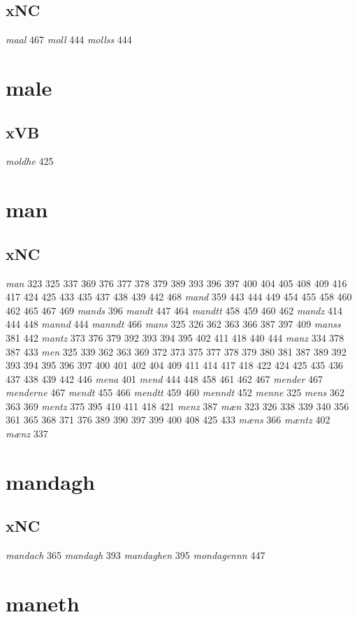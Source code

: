 \documentclass[a4paper,twocolumn]{article}
\begin{document}
\subsection{xNC}
\label{sec:orgcd0ce71}
\emph{maal} 467 \emph{moll} 444 \emph{mollss} 444 
\section{male}
\label{sec:org4d25cea}
\subsection{xVB}
\label{sec:org668a8d7}
\emph{moldhe} 425 
\section{man}
\label{sec:orgd9d9790}
\subsection{xNC}
\label{sec:orga196f7a}
\emph{man} 323 325 337 369 376 377 378 379 389 393 396 397 400 404 405 408 409 416 417 424 425 433 435 437 438 439 442 468 \emph{mand} 359 443 444 449 454 455 458 460 462 465 467 469 \emph{mands} 396 \emph{mandt} 447 464 \emph{mandtt} 458 459 460 462 \emph{mandz} 414 444 448 \emph{mannd} 444 \emph{manndt} 466 \emph{mans} 325 326 362 363 366 387 397 409 \emph{manss} 381 442 \emph{mantz} 373 376 379 392 393 394 395 402 411 418 440 444 \emph{manz} 334 378 387 433 \emph{men} 325 339 362 363 369 372 373 375 377 378 379 380 381 387 389 392 393 394 395 396 397 400 401 402 404 409 411 414 417 418 422 424 425 435 436 437 438 439 442 446 \emph{mena} 401 \emph{mend} 444 448 458 461 462 467 \emph{mender} 467 \emph{menderne} 467 \emph{mendt} 455 466 \emph{mendtt} 459 460 \emph{menndt} 452 \emph{menne} 325 \emph{mens} 362 363 369 \emph{mentz} 375 395 410 411 418 421 \emph{menz} 387 \emph{mæn} 323 326 338 339 340 356 361 365 368 371 376 389 390 397 399 400 408 425 433 \emph{mæns} 366 \emph{mæntz} 402 \emph{mænz} 337 
\section{mandagh}
\label{sec:org4afb1e9}
\subsection{xNC}
\label{sec:org514c064}
\emph{mandach} 365 \emph{mandagh} 393 \emph{mandaghen} 395 \emph{mondagennn} 447 
\section{maneth}
\label{sec:org2b8460f}
\end{document}
